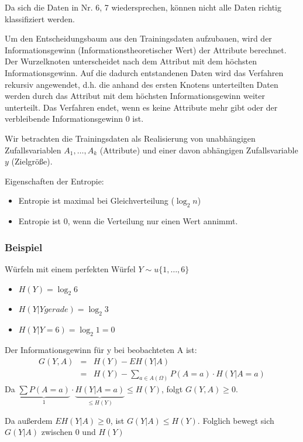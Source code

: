 Da sich die Daten in Nr. 6, 7 wiedersprechen, können nicht alle Daten richtig klassifiziert werden.

Um den Entscheidungsbaum aus den Trainingsdaten aufzubauen, wird der Informationsgewinn (Informationstheoretischer Wert) der Attribute berechnet.
Der Wurzelknoten unterscheidet nach dem Attribut mit dem höchsten Informationsgewinn.
Auf die dadurch entstandenen Daten wird das Verfahren rekursiv angewendet, d.h. die anhand des ersten Knotens unterteilten Daten werden durch das Attribut mit dem höchsten Informationsgewinn weiter unterteilt.
Das Verfahren endet, wenn es keine Attribute mehr gibt oder der verbleibende Informationsgewinn 0 ist.

Wir betrachten die Trainingsdaten als Realisierung von unabhängigen Zufallsvariablen \(A_1,\dots, A_k\) (Attribute) und einer davon abhängigen Zufallsvariable \(y\) (Zielgröße).

Eigenschaften der Entropie:
\begin{itemize}
	\item Entropie ist maximal bei Gleichverteilung (\(\log_2 n\))
	\item Entropie ist 0, wenn die Verteilung nur einen Wert annimmt.
\end{itemize}
\subsubsection{Beispiel}
Würfeln mit einem perfekten Würfel \(Y \sim u\{1,\dots,6\}\)
\begin{itemize}
	\item \(H(Y) = \log_2 6\)
	\item \(H(Y|Y gerade) = \log_2 3\)
	\item \(H(Y|Y=6) = \log_2 1 = 0\)
\end{itemize}
Der Informationsgewinn für y bei beobachteten A ist:
\begin{eqnarray*}
 G(Y,A) &=& H(Y) - E H(Y|A)\\
		&=& H(Y) - \sum\limits_{a \in A(\Omega)} P(A=a) \cdot H(Y|A=a)
\end{eqnarray*}
Da \(\underbrace{\sum P(A=a)}_{1} \cdot \underbrace{H(Y|A=a)}_{\leq H(Y)} \leq H(Y)\), folgt \(G(Y,A) \geq 0\).

Da außerdem \(E H(Y|A) \geq 0\), ist \(G(Y|A) \leq H(Y)\).
Folglich bewegt sich \(G(Y|A)\) zwischen 0 und \(H(Y)\)

\newpage
